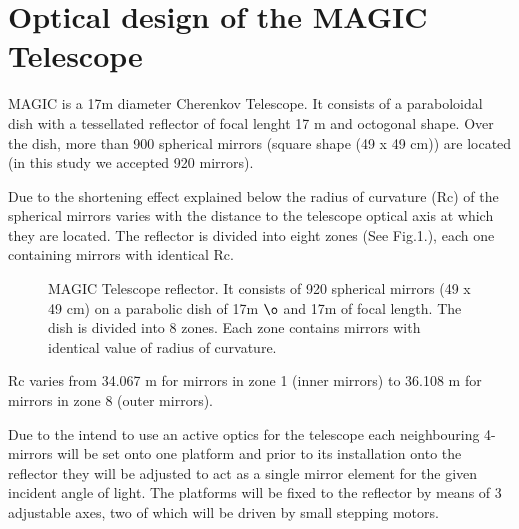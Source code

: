 
















\section{Optical design of the MAGIC Telescope}

{\footnotesize 
MAGIC is a 17m diameter Cherenkov Telescope.
It consists of a paraboloidal dish with a tessellated reflector of focal lenght 17 m and octogonal shape.
Over the dish, more than 900 spherical mirrors (square shape (49 x 49 cm)) are located (in this study we accepted 920 mirrors).  

Due to the shortening effect explained below
the radius of curvature (Rc) of the spherical mirrors varies with the distance to the telescope optical axis at which they are located.
The reflector is divided into eight zones (See Fig.1.), each one containing mirrors with identical Rc. 

 \renewcommand{\textfraction}{0.1}
 \renewcommand{\bottomfraction}{0.9}
 \renewcommand{\topfraction}{0.9}
 \renewcommand{\floatpagefraction}{0.9}

\begin{figure}[h]\centering
\leavevmode
\epsfxsize=12cm
\caption{\tiny{MAGIC Telescope reflector. It consists of 920 spherical mirrors (49 x 49 cm) on a parabolic dish of 17m $\o$ and 
17m of focal length. The dish is divided into 8 zones. Each zone contains mirrors with identical value of radius of curvature.}}


\end{figure}  
Rc varies from  34.067 m for mirrors in zone 1 (inner mirrors) to 36.108 m for mirrors in zone 8 (outer mirrors). 

Due to the intend to use an active optics for the telescope each neighbouring 4-mirrors will be set onto one platform and prior to its installation onto the reflector they will be adjusted to act as a single mirror element for the given incident angle of light. The platforms will be fixed to the reflector by means of 3 adjustable axes, two of which will be driven by small stepping motors.



}
